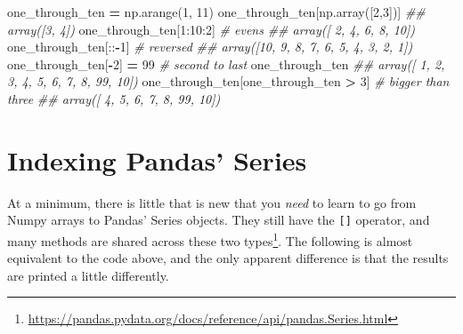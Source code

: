 \documentclass[
  12pt,
  krantz2]{krantz}
\makeatletter
\newenvironment{Shaded}{\begin{snugshade}}{\end{snugshade}}
\newcommand{\CommentTok}[1]{\textcolor[rgb]{0.37,0.37,0.37}{\textit{#1}}}
\newcommand{\DecValTok}[1]{\textcolor[rgb]{0.06,0.06,0.06}{#1}}
\newcommand{\NormalTok}[1]{#1}
\newcommand{\OperatorTok}[1]{\textcolor[rgb]{0.43,0.43,0.43}{\textbf{#1}}}
\renewcommand{\href}[2]{#2\footnote{\url{#1}}}
\newenvironment{kframe}{%
\medskip{}
\setlength{\fboxsep}{.8em}
 \def\at@end@of@kframe{}%
 \ifinner\ifhmode%
  \def\at@end@of@kframe{\end{minipage}}%
  \begin{minipage}{\columnwidth}%
 \fi\fi%
 \def\FrameCommand##1{\hskip\@totalleftmargin \hskip-\fboxsep
 \colorbox{shadecolor}{##1}\hskip-\fboxsep
     \hskip-\linewidth \hskip-\@totalleftmargin \hskip\columnwidth}%
 \MakeFramed {\advance\hsize-\width
   \@totalleftmargin\z@ \linewidth\hsize
   \@setminipage}}%
 {\par\unskip\endMakeFramed%
 \at@end@of@kframe}
\renewenvironment{Shaded}{\begin{kframe}}{\end{kframe}}
\makeatother
\begin{document}
\begin{Shaded}
\begin{Highlighting}[]
\NormalTok{one\_through\_ten }\OperatorTok{=}\NormalTok{ np.arange(}\DecValTok{1}\NormalTok{, }\DecValTok{11}\NormalTok{)}
\NormalTok{one\_through\_ten[np.array([}\DecValTok{2}\NormalTok{,}\DecValTok{3}\NormalTok{])]}
\CommentTok{\#\# array([3, 4])}
\NormalTok{one\_through\_ten[}\DecValTok{1}\NormalTok{:}\DecValTok{10}\NormalTok{:}\DecValTok{2}\NormalTok{] }\CommentTok{\# evens}
\CommentTok{\#\# array([ 2,  4,  6,  8, 10])}
\NormalTok{one\_through\_ten[::}\OperatorTok{{-}}\DecValTok{1}\NormalTok{] }\CommentTok{\# reversed}
\CommentTok{\#\# array([10,  9,  8,  7,  6,  5,  4,  3,  2,  1])}
\NormalTok{one\_through\_ten[}\OperatorTok{{-}}\DecValTok{2}\NormalTok{] }\OperatorTok{=} \DecValTok{99} \CommentTok{\# second to last}
\NormalTok{one\_through\_ten}
\CommentTok{\#\# array([ 1,  2,  3,  4,  5,  6,  7,  8, 99, 10])}
\NormalTok{one\_through\_ten[one\_through\_ten }\OperatorTok{\textgreater{}} \DecValTok{3}\NormalTok{] }\CommentTok{\# bigger than three}
\CommentTok{\#\# array([ 4,  5,  6,  7,  8, 99, 10])}
\end{Highlighting}
\end{Shaded}

\hypertarget{indexing-pandas-series}{%
\section{Indexing Pandas' Series}\label{indexing-pandas-series}}

At a minimum, there is little that is new that you \emph{need} to learn to go from Numpy arrays to Pandas' Series objects. They still have the \texttt{{[}{]}} operator, and \href{https://pandas.pydata.org/docs/reference/api/pandas.Series.html}{many methods are shared across these two types}. The following is almost equivalent to the code above, and the only apparent difference is that the results are printed a little differently.
\end{document}
